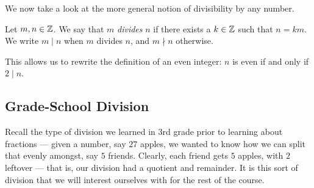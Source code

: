 \documentclass{article}
\begin{document}
We now take a look at the more general notion of divisibility by any number. \newpage

\begin{definition}\label{divisibility}
Let $m,n\in\mathbb Z$. We say that $m$ \textit{divides} $n$ if there exists a $k\in \mathbb Z$ such that $n = km$. We write $m\mid n$ when $m$ divides $n$, and $m\nmid n$ otherwise.
\end{definition}

This allows us to rewrite the definition of an even integer: $n$ is even if and only if $2 \mid n$.

\subsection*{Grade-School Division}
Recall the type of division we learned in $3$rd grade prior to learning about fractions --- given a number, say $27$ apples, we wanted to know how we can split that evenly amongst, say $5$ friends. Clearly, each friend gets $5$ apples, with $2$ leftover --- that is, our division had a quotient and remainder. It is this sort of division that we will interest ourselves with for the rest of the course.
\end{document}
